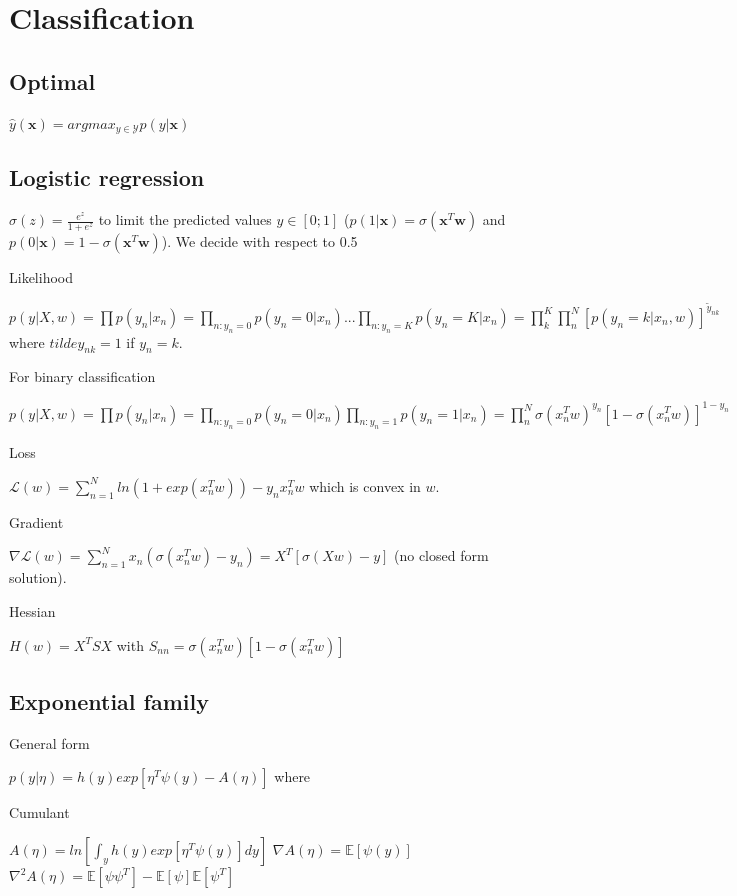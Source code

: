 \section{Classification}
\subsection{Optimal}
$\hat{y}(\mathbf{x}) = argmax_{y\in \mathcal{Y}} p(y|\mathbf{x})$

\subsection{Logistic regression}
$\sigma(z) = \frac{e^z}{1+e^z}$ to limit the predicted values $y\in [0;1]$ ($p(1|\mathbf{x}) = \sigma(\mathbf{x}^T\mathbf{w})$ and $p(0|\mathbf{x}) = 1-\sigma(\mathbf{x}^T\mathbf{w})$). We decide with respect to 0.5

Likelihood

$p(y | X,w) = \prod p(y_n|x_n) = \prod_{n:y_n=0} p(y_n=0|x_n) ... \prod_{n:y_n=K} p(y_n=K|x_n) = \prod^K_k \prod^N_n [p(y_n = k | x_n,w)]^{\tilde{y}_{nk}}$ where ${tilde{y}_{nk}} = 1$ if $y_n=k$.

For binary classification

$p(y | X, w) = \prod p(y_n|x_n) = \prod_{n:y_n=0} p(y_n=0|x_n) \prod_{n:y_n=1} p(y_n=1|x_n) = \prod^N_n \sigma({x_n^T w})^{y_n}[1-\sigma({x_n^T w})]^{1-y_n}$

Loss

$\mathcal{L}(w) = \sum_{n=1}^N ln(1 + exp(x_n^T w)) - y_n x_n^T w$ which is convex in $w$.

Gradient

$\nabla \mathcal{L}(w) = \sum_{n=1}^N x_n (\sigma(x_n^T w) - y_n) = X^T[\sigma(Xw) - y]$ (no closed form solution).

Hessian

$H(w) = X^T S X$ with $S_{nn} = \sigma(x_n^T w)[1-\sigma(x_n^T w)]$

\subsection{Exponential family}
General form

$p(y|\eta) = h(y) exp[\eta^T \psi(y) - A(\eta)]$ where

Cumulant

$A(\eta) = ln[\int_y h(y) exp[\eta^T \psi(y)] dy]$
\newline
$\nabla A(\eta) = \mathbb{E}[\psi(y)]$
\newline
$\nabla^2 A(\eta) = \mathbb{E}[\psi\psi^T] - \mathbb{E}[\psi]\mathbb{E}[\psi^T]$

